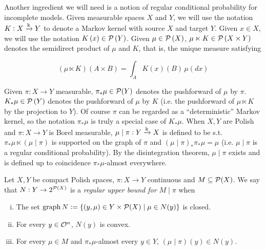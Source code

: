 Another ingredient we will need is a notion of regular conditional probability for incomplete models. Given measurable spaces $X$ and $Y$, we will use the notation $K: X \xrightarrow{\textnormal{k}} Y$ to denote a Markov kernel with source $X$ and target $Y$. Given $x \in X$, we will use the notation $K\left(x\right) \in \mathcal{P}\left(Y\right)$. Given $\mu \in \mathcal{P}\left(X\right)$, $\mu \ltimes K \in \mathcal{P}\left(X \times Y\right)$ denotes the semidirect product of $\mu$ and $K$, that is, the unique measure satisfying

\begin{equation}
(\mu \ltimes K)(A \times B) = \int_A K(x)(B)\, \mu(dx)
\end{equation} 

Given $\pi:X\rightarrow Y$ measurable, $\pi_*\mu\in\mathcal{P}(Y)$ denotes the pushforward of $\mu$ by $\pi$. $K_* \mu \in \mathcal{P}\left(Y\right)$ denotes the pushforward of $\mu$ by $K$ (i.e. the pushforward of $\mu \ltimes K$ by the projection to $Y$). Of course $\pi$ can be regarded as a \enquote{deterministic} Markov kernel, so the notation $\pi_*\mu$ is truly a special case of $K_*\mu$. When $X,Y$ are Polish and $\pi: X \rightarrow Y$ is Borel measurable, $\mu \mid \pi: Y \xrightarrow{\textnormal{k}} X$ is defined to be s.t. $\pi_* \mu \ltimes \left(\mu \mid \pi\right)$ is supported on the graph of $\pi$ and $\left(\mu \mid \pi\right)_* \pi_* \mu = \mu$ (i.e. $\mu \mid \pi$ is a regular conditional probability). By the disintegration theorem, $\mu \mid \pi$ exists and is defined up to coincidence $\pi_* \mu$-almost everywhere.

\begin{samepage}
\begin{definition}
\label{def:update_incomplete}

Let $X,Y$ be compact Polish spaces, $\pi: X \rightarrow Y$ continuous and $M \subseteq \mathcal{P}(X)$. We say that $N: Y \rightarrow 2^{\mathcal{P}(X)}$ is a \emph{regular upper bound for $M \mid \pi$} when 
%
\begin{enumerate}[i.]
\item\label{con:def__update_incomplete__clos} The set $\operatorname{graph}{N}:=\{(y,\mu)\in Y\times\mathcal{P}(X) \mid \mu \in N(y)\}$ is closed.
\item\label{con:def__update_incomplete__conv} For every $y \in \mathcal{O}^n$, $N(y)$ is convex.
\item\label{con:def__update_incomplete__cond} For every $\mu \in M$ and $\pi_*\mu$-almost every $y \in Y$, $(\mu \mid \pi)(y) \in N(y)$.
\end{enumerate}

\end{definition}
\end{samepage}

